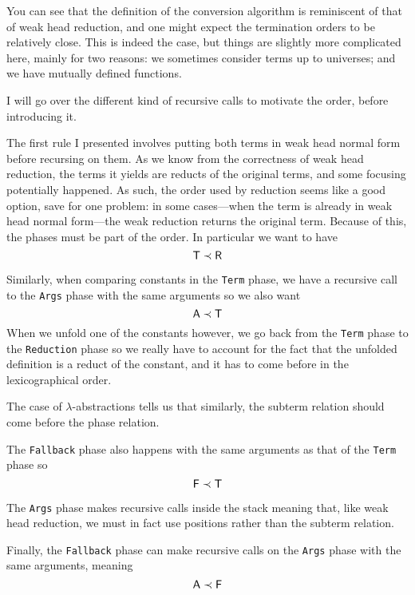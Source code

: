 You can see that the definition of the conversion algorithm is reminiscent of
that of weak head reduction, and one might expect the termination orders to be
relatively close. This is indeed the case, but things are slightly more
complicated here, mainly for two reasons: we sometimes consider terms up to
universes; and we have mutually defined functions.

I will go over the different kind of recursive calls to motivate the order,
before introducing it.

The first rule I presented involves putting both terms in weak head normal
form before recursing on them. As we know from the correctness of weak head
reduction, the terms it yields are reducts of the original terms, and some
focusing potentially happened. As such, the order used by reduction seems like
a good option, save for one problem: in some cases---when the term is already
in weak head normal form---the weak reduction returns the original term.
Because of this, the phases must be part of the order.
In particular we want to have
\[
  \mathsf{T} \prec \mathsf{R}
\]

Similarly, when comparing constants in the \texttt{Term} phase,
we have a recursive call to the \texttt{Args} phase with the same
arguments so we also want
\[
  \mathsf{A} \prec \mathsf{T}
\]
When we unfold one of the constants however, we go back from the
\texttt{Term} phase to the \texttt{Reduction} phase
so we really have to account for the fact that the unfolded definition is a
reduct of the constant, and it has to come before in the lexicographical
order.

The case of \(\lambda\)-abstractions tells us that similarly, the subterm
relation should come before the phase relation.

The \texttt{Fallback} phase also happens with the same arguments as
that of the \texttt{Term} phase so
\[
  \mathsf{F} \prec \mathsf{T}
\]

The \texttt{Args} phase makes recursive calls inside the stack meaning
that, like weak head reduction, we must in fact use positions rather than the
subterm relation.

Finally, the \texttt{Fallback} phase can make recursive calls on the
\texttt{Args} phase with the same arguments, meaning
\[
  \mathsf{A} \prec \mathsf{F}
\]


